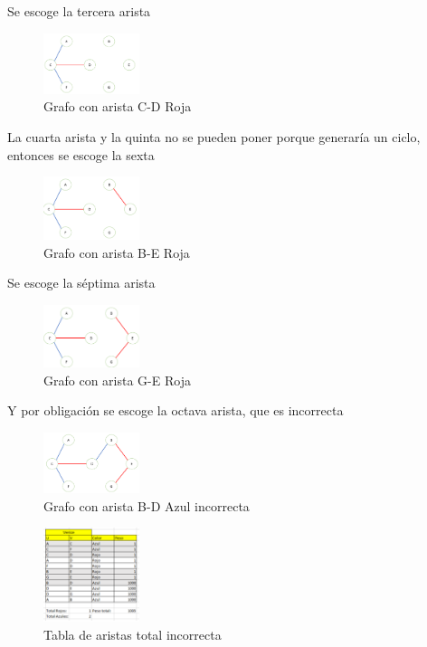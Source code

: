 \documentclass[conference,compsoc]{IEEEtran}
\begin{document}
Se escoge la tercera arista

\begin{figure}[h] 
    \centering
    \includegraphics[width=0.25\textwidth]{Problema2/s7.png}
    \caption{Grafo con arista C-D Roja}
    \label{fig:mesh1}
\end{figure}

La cuarta arista y la quinta no se pueden poner porque generaría un ciclo, entonces se escoge la sexta

\begin{figure}[h] 
    \centering
    \includegraphics[width=0.25\textwidth]{Problema2/s8.png}
    \caption{Grafo con arista B-E Roja}
    \label{fig:mesh1}
\end{figure}
$$$$$$$$
Se escoge la séptima arista

\begin{figure}[h] 
    \centering
    \includegraphics[width=0.25\textwidth]{Problema2/s9.png}
    \caption{Grafo con arista G-E Roja}
    \label{fig:mesh1}
\end{figure}

Y por obligación se escoge la octava arista, que es incorrecta

\begin{figure}[h] 
    \centering
    \includegraphics[width=0.25\textwidth]{Problema2/s10.png}
    \caption{Grafo con arista B-D Azul incorrecta}
    \label{fig:mesh1}
\end{figure}

\begin{figure}[h] 
    \centering
    \includegraphics[width=0.25\textwidth]{Problema2/s11.png}
    \caption{Tabla de aristas total incorrecta}
    \label{fig:mesh1}
\end{figure}
\end{document}
